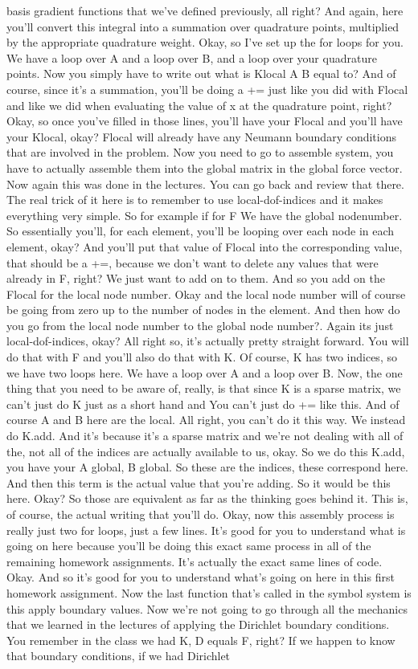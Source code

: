 \documentclass[10pt]{article}
\begin{document}
{basis gradient functions that we've defined previously, all right? And again, here you'll convert this integral into a summation over quadrature points, multiplied by the appropriate quadrature weight. Okay, so I've set up the for loops for you. We have a loop over A and a loop over B, and a loop over your quadrature points. Now you simply have to write out what is Klocal A B equal to? And of course, since it's a summation, you'll be doing a += just like you did with Flocal and like we did when evaluating the value of x at the quadrature point, right? Okay, so once you've filled in those lines, you'll have your Flocal and you'll have your Klocal, okay? Flocal will already have any Neumann boundary conditions that are involved in the problem. Now you need to go to assemble system, you have to actually assemble them into the global matrix in the global force vector. Now again this was done in the lectures. You can go back and review that there. The real trick of it here is to remember to use local-dof-indices and it makes everything very simple. So for example if for F We have the global nodenumber. So essentially you'll, for each element, you'll be looping over each node in each element, okay? And you'll put that value of Flocal into the corresponding value, that should be a +=, because we don't want to delete any values that were already in F, right? We just want to add on to them. And so you add on the Flocal for the local node number. Okay and the local node number will of course be going from zero up to the number of nodes in the element. And then how do you go from the local node number to the global node number?. Again its just local-dof-indices, okay? All right so, it's actually pretty straight forward. You will do that with F and you'll also do that with K. Of course, K has two indices, so we have two loops here. We have a loop over A and a loop over B. Now, the one thing that you need to be aware of, really, is that since K is a sparse matrix, we can't just do K  just as a short hand and  You can't just do += like this. And of course A and B here are the local. All right, you can't do it this way. We instead do K.add. And it's because it's a sparse matrix and we're not dealing with all of the, not all of the indices are actually available to us, okay. So we do this K.add, you have your A global, B global. So these are the indices, these correspond here. And then this term is the actual value that you're adding. So it would be this here. Okay? So those are equivalent as far as the thinking goes behind it. This is, of course, the actual writing that you'll do. Okay, now this assembly process is really just two for loops, just a few lines. It's good for you to understand what is going on here because you'll be doing this exact same process in all of the remaining homework assignments. It's actually the exact same lines of code. Okay. And so it's good for you to understand what's going on here in this first homework assignment. Now the last function that's called in the symbol system is this apply boundary values. Now we're not going to go through all the mechanics that we learned in the lectures of applying the Dirichlet boundary conditions. You remember in the class we had K, D equals F, right? If we happen to know that boundary conditions, if we had Dirichlet }
\end{document}
